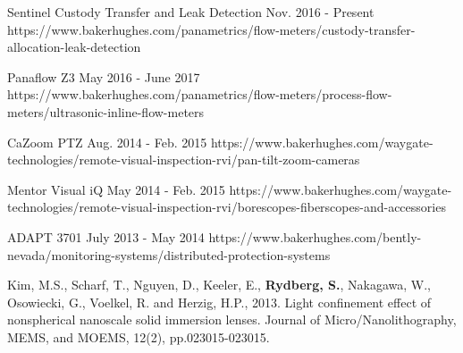 

\begin{cventries}

  \cvproduct
    {Sentinel Custody Transfer and Leak Detection} %
    {Nov. 2016 - Present} %
    {https://www.bakerhughes.com/panametrics/flow-meters/custody-transfer-allocation-leak-detection}

  \cvproduct
    {Panaflow Z3} %
    {May 2016 - June 2017} %
    {https://www.bakerhughes.com/panametrics/flow-meters/process-flow-meters/ultrasonic-inline-flow-meters}

  \cvproduct
    {CaZoom PTZ} %
    {Aug. 2014 - Feb. 2015} %
    {https://www.bakerhughes.com/waygate-technologies/remote-visual-inspection-rvi/pan-tilt-zoom-cameras}

  \cvproduct
    {Mentor Visual iQ} %
    {May 2014 - Feb. 2015} %
    {https://www.bakerhughes.com/waygate-technologies/remote-visual-inspection-rvi/borescopes-fiberscopes-and-accessories}

  \cvproduct
    {ADAPT 3701} %
    {July 2013 - May 2014} %
    {https://www.bakerhughes.com/bently-nevada/monitoring-systems/distributed-protection-systems}
    
\end{cventries}

\begin{cvcitations}
  \cvcite
    {Kim, M.S., Scharf, T., Nguyen, D., Keeler, E., \textbf{Rydberg, S.}, Nakagawa, W., Osowiecki, G., Voelkel, R. and Herzig, H.P., 2013. Light confinement effect of nonspherical nanoscale solid immersion lenses. Journal of Micro/Nanolithography, MEMS, and MOEMS, 12(2), pp.023015-023015.} %
\end{cvcitations}

